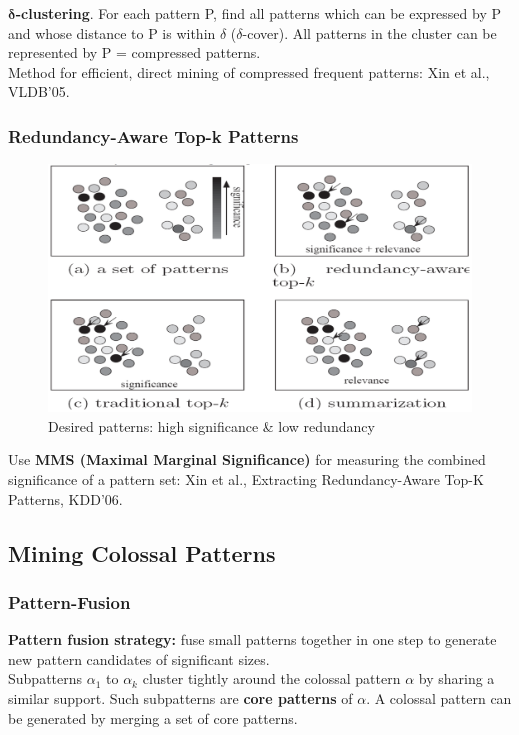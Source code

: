 \textbf{$\mathbf{\delta}$-clustering}. For each pattern P, find all patterns which can be expressed by P and whose distance to P is within $\delta$ ($\delta$-cover). All patterns in the cluster can be represented by P = compressed patterns.\\

Method for efficient, direct mining of compressed frequent patterns: Xin et al., VLDB’05.\\

\subsubsection{Redundancy-Aware Top-k Patterns}
\begin{figure}[h]
    \centering
    \includegraphics[width=\linewidth]{desired_patterns.png}
    \caption{Desired patterns: high significance \& low redundancy}
\end{figure}

Use \textbf{MMS (Maximal Marginal Significance)} for measuring the combined significance of a pattern set: Xin et al., Extracting Redundancy-Aware Top-K Patterns, KDD’06.

\subsection{Mining Colossal Patterns}
\subsubsection{Pattern-Fusion}
\textbf{Pattern fusion strategy:} fuse small patterns together in one step to generate new pattern candidates of significant sizes.\\

Subpatterns $\alpha_1$ to $\alpha_k$ cluster tightly around the colossal pattern $\alpha$ by sharing a similar support. Such subpatterns are \textbf{core patterns} of $\alpha$. A colossal pattern can be generated by merging a set of core patterns.

